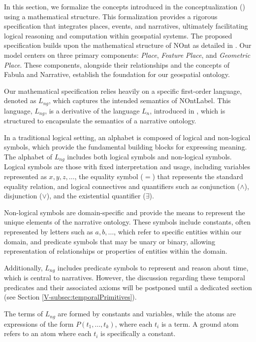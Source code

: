 In this section, we formalize the concepts introduced in the conceptualization () using a mathematical structure. This formalization provides a rigorous specification that integrates places, events, and narratives, ultimately facilitating logical reasoning and computation within geospatial systems. The proposed specification builds upon the mathematical structure of NOnt as detailed in \cite{meghiniRepresentingNarrativesDigital2021}. Our model centers on three primary components: \textit{Place}, \textit{Feature Place}, and \textit{Geometric Place}. These components, alongside their relationships and the concepts of Fabula and Narrative, establish the foundation for our geospatial ontology.

Our mathematical specification relies heavily on a specific first-order language, denoted as $L_{ng}$, which captures the intended semantics of \acrshort{NOntLabel}. This language, $L_{ng}$, is a derivative of the language $L_n$, introduced in \cite{meghiniRepresentingNarrativesDigital2021}, which is structured to encapsulate the semantics of a narrative ontology.

In a traditional logical setting, an alphabet is composed of logical and non-logical symbols, which provide the fundamental building blocks for expressing meaning. The alphabet of $L_{ng}$ includes both logical symbols and non-logical symbols. Logical symbols are those with fixed interpretation and usage, including variables represented as $x, y, z, \dots$, the equality symbol ($=$) that represents the standard equality relation, and logical connectives and quantifiers such as conjunction ($\land$), disjunction ($\lor$), and the existential quantifier ($\exists$).

Non-logical symbols are domain-specific and provide the means to represent the unique elements of the narrative ontology. These symbols include constants, often represented by letters such as $a, b, \dots$, which refer to specific entities within our domain, and predicate symbols that may be unary or binary, allowing representation of relationships or properties of entities within the domain.

Additionally, $L_{ng}$ includes predicate symbols to represent and reason about time, which is central to narratives. However, the discussion regarding these temporal predicates and their associated axioms will be postponed until a dedicated section (see Section \ref{V-subsec:temporalPrimitives}).

The terms of $L_{ng}$ are formed by constants and variables, while the atoms are expressions of the form $P(t_1, \dots, t_k)$, where each $t_i$ is a term. A ground atom refers to an atom where each $t_i$ is specifically a constant.


